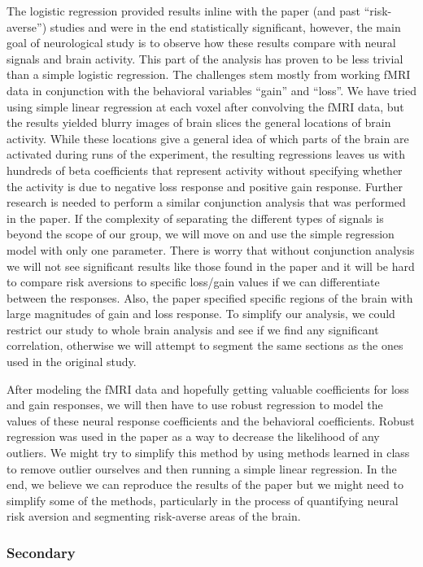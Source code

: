 \documentclass[11pt]{article}
\begin{document}
The logistic regression provided results inline with the paper (and past
``risk-averse'') studies and were in the end statistically significant,
however, the main goal of neurological study is to observe how these results
compare with neural signals and brain activity. This part of the analysis has
proven to be less trivial than a simple logistic regression. The challenges
stem mostly from working fMRI data in conjunction with the behavioral variables
``gain'' and ``loss''. We have tried using simple linear regression at each
voxel after convolving the fMRI data, but the results yielded blurry images of
brain slices the general locations of brain activity. While these locations
give a general idea of which parts of the brain are activated during runs of
the experiment, the resulting regressions leaves us with hundreds of beta
coefficients that represent activity without specifying whether the activity is
due to negative loss response and positive gain response. Further research is
needed to perform a similar conjunction analysis that was performed in the
paper. If the complexity of separating the different types of signals is beyond
the scope of our group, we will move on and use the simple regression model
with only one parameter. There is worry that without conjunction analysis we
will not see significant results like those found in the paper and it will be
hard to compare risk aversions to specific loss/gain values if we can
differentiate between the responses. Also, the paper specified specific regions
of the brain with large magnitudes of gain and loss response. To simplify our
analysis, we could restrict our study to whole brain analysis and see if we
find any significant correlation, otherwise we will attempt to segment the same
sections as the ones used in the original study. 

After modeling the fMRI data and hopefully getting valuable coefficients for
loss and gain responses, we will then have to use robust regression to model
the values of these neural response coefficients and the behavioral
coefficients. Robust regression was used in the paper as a way to decrease the
likelihood of any outliers. We might try to simplify this method by using
methods learned in class to remove outlier ourselves and then running a simple
linear regression. In the end, we believe we can reproduce the results of the
paper but we might need to simplify some of the methods, particularly in the
process of quantifying neural risk aversion and segmenting risk-averse areas of
the brain.

\subsubsection{Secondary}
\end{document}
